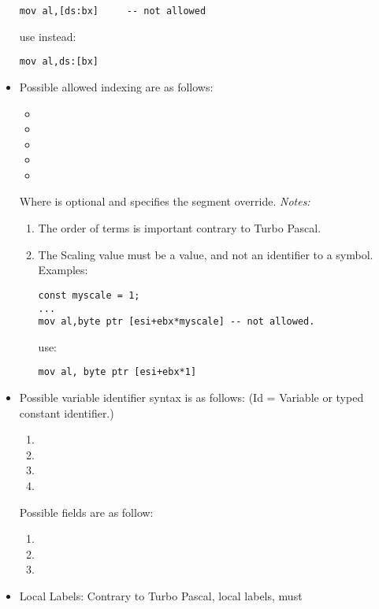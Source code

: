 \documentclass{report}
\begin{document}
\begin{itemize}
\begin{verbatim}
mov al,[ds:bx]     -- not allowed
\end{verbatim}
use instead:
\begin{verbatim}
mov al,ds:[bx]
\end{verbatim}
\item  Possible allowed indexing are as follows:
\begin{itemize}
\item    {}
\item    {}
\item    {}
\item    {}
\item    {}
\end{itemize}
Where  is optional and specifies the segment override.
{\em Notes:}
\begin{enumerate}
\item The order of terms is important contrary to Turbo Pascal.
\item The Scaling value must be a value, and not an identifier
to a symbol.\\  Examples:
\begin{verbatim}
const myscale = 1;
...
mov al,byte ptr [esi+ebx*myscale] -- not allowed.
\end{verbatim}
use:
\begin{verbatim}
mov al, byte ptr [esi+ebx*1]
\end{verbatim}
\end{enumerate}
\item  Possible variable identifier syntax is as follows:
 (Id = Variable or typed constant identifier.)
\begin{enumerate}
\item {}
\item \var{[ID]}
\item \var{[ID+expr]}
\item {}
\end{enumerate}
 Possible fields are as follow:
\begin{enumerate}
\item  {}
\item  {}
\item  {}
\end{enumerate}
\item  Local Labels: Contrary to Turbo Pascal, local labels, must

\end{itemize}
\end{document}
